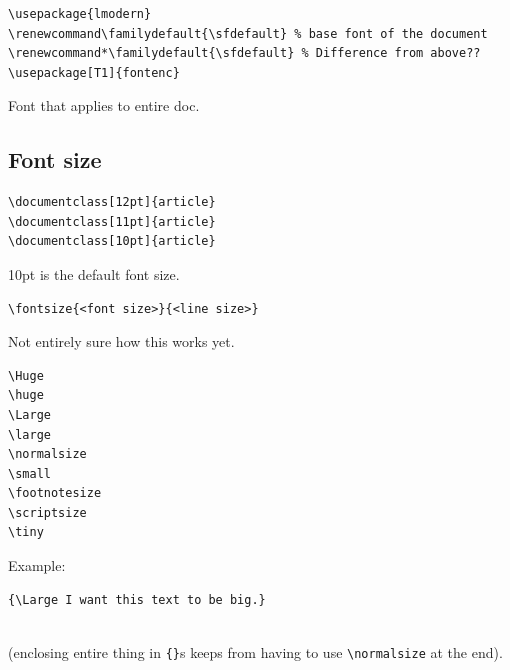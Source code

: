 \documentclass{article}
\begin{document}
\begin{minipage}[t]{0.5\textwidth}
    \begin{lstlisting}
\usepackage{lmodern}
\renewcommand\familydefault{\sfdefault} % base font of the document
\renewcommand*\familydefault{\sfdefault} % Difference from above??
\usepackage[T1]{fontenc}
    \end{lstlisting}
\end{minipage}
\begin{minipage}[t]{0.5\textwidth}
    Font that applies to entire doc.
\end{minipage}

\subsection{Font size}
\begin{minipage}[t]{0.5\textwidth}
\begin{lstlisting}
\documentclass[12pt]{article}
\documentclass[11pt]{article}
\documentclass[10pt]{article}
\end{lstlisting}
\end{minipage}
\begin{minipage}[t]{0.5\textwidth}
10pt is the default font size.
\end{minipage}

\begin{minipage}[t]{0.5\textwidth}
\begin{verbatim}
\fontsize{<font size>}{<line size>}
\end{verbatim}
\end{minipage}
\begin{minipage}[t]{0.5\textwidth}
    Not entirely sure how this works yet.
\end{minipage}

\begin{minipage}[t]{0.5\textwidth}
\begin{verbatim}
\Huge
\huge
\Large
\large
\normalsize
\small
\footnotesize
\scriptsize
\tiny
\end{verbatim}
\end{minipage}
\begin{minipage}[t]{0.5\textwidth}
    Example:
\begin{verbatim}
{\Large I want this text to be big.}
\end{verbatim}
    \vspace{-2ex}{\Large I want this text to be big.}\\
(enclosing entire thing in \verb|{}|s keeps from having to use
\verb|\normalsize| at the end).
\end{minipage}
\end{document}
